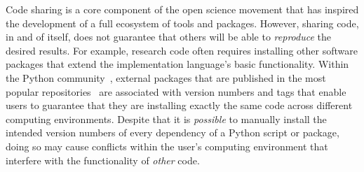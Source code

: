 \documentclass[preprint,12pt, a4paper]{elsarticle}
\begin{document}
Code sharing is a core component of the open science movement that has
inspired the development of a full ecosystem of tools and packages.
However, sharing code, in and of itself, does not guarantee that
others will be able to \textit{reproduce} the desired results.  For
example, research code often requires installing other software
packages that extend the implementation language's basic
functionality.  Within the Python community~\citep{vanR95}, external
packages that are published in the most popular
repositories~\citep{pypi, Anac12} are associated with version numbers
and tags that enable users to guarantee that they are installing
exactly the same code across different computing environments.
Despite that it is \textit{possible} to manually install the intended
version numbers of every dependency of a Python script or package,
doing so may cause conflicts within the user's computing environment
that interfere with the functionality of \textit{other} code.
\end{document}
